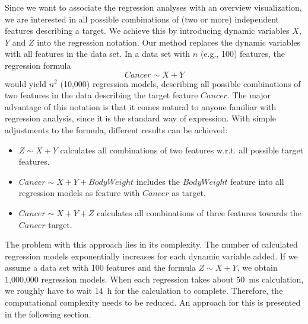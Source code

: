 \documentclass[journal]{style/vgtc} 			          %
\begin{document}
Since we want to associate the regression analyses with an overview visualization, we are interested in all possible combinations of (two or more) independent features describing a target.
We achieve this by introducing dynamic variables $X$, $Y$ and $Z$ into the regression notation.
Our method replaces the dynamic variables with all features in the data set.
In a data set with $n$ (e.g., 100) features, the regression formula
\begin{equation}
Cancer \sim X + Y
\end{equation}
would yield $n^2$ (10,000) regression models, describing all possible combinations of two features in the data describing the target feature $Cancer$.
The major advantage of this notation is that it comes natural to anyone familiar with regression analysis, since it is the standard way of expression.
With simple adjustments to the formula, different results can be achieved:
\begin{itemize}
	\item $Z \sim X + Y$ calculates all combinations of two features w.r.t. all possible target features.
	\item $Cancer \sim X + Y + BodyWeight$ includes the $BodyWeight$ feature into all regression models as feature with $Cancer$ as target.
	\item $Cancer \sim X + Y + Z$ calculates all combinations of three features towards the $Cancer$ target.
\end{itemize}
The problem with this approach lies in its complexity.
The number of calculated regression models exponentially increases for each dynamic variable added.
If we assume a data set with 100 features and the formula $Z \sim X + Y$, we obtain 1,000,000 regression models.
When each regression takes about 50~ms calculation, we roughly have to wait 14~h for the calculation to complete.
Therefore, the computational complexity needs to be reduced.
An approach for this is presented in the following section.
\end{document}
